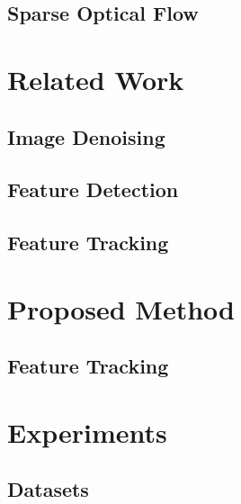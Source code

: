 \documentclass[journal]{IEEEtran}
\begin{document}
\subsection{Sparse Optical Flow}
\label{sec:background_sparse_of}


\section{Related Work}
\label{sec:related_work}


\subsection{Image Denoising}
\label{sec:related_work_denoising}


\subsection{Feature Detection}
\label{sec:related_work_feature_detection}


\subsection{Feature Tracking}
\label{sec:related_work_feature_tracking}


\section{Proposed Method}
\label{sec:method}


\subsection{Feature Tracking}
\label{sec:method_feature_tracking}


\section{Experiments}
\label{sec:experiments}


\subsection{Datasets}
\label{sec:experiments_datasets}

\end{document}

